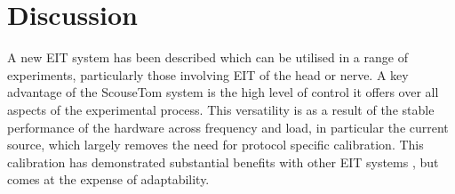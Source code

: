 \section{Discussion}
A new EIT system has been described which can be utilised in a range of experiments, particularly those involving EIT of the head or nerve. A key advantage of the ScouseTom system is the high level of control it offers over all aspects of the experimental process. This versatility is as a result of the stable performance of the hardware across frequency and load, in particular the current source, which largely removes the need for protocol specific calibration. This calibration has demonstrated substantial benefits with other EIT systems \cite{Hun_Wi_2014} \cite{khan}, but comes at the expense of adaptability.
